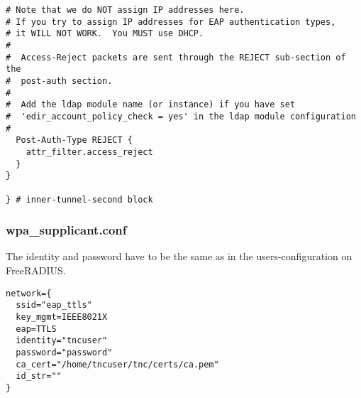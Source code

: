 \begin{lstlisting}[style=eapttls-config]
# Note that we do NOT assign IP addresses here.
# If you try to assign IP addresses for EAP authentication types,
# it WILL NOT WORK.  You MUST use DHCP.
#
#  Access-Reject packets are sent through the REJECT sub-section of the
#  post-auth section.
#
#  Add the ldap module name (or instance) if you have set 
#  'edir_account_policy_check = yes' in the ldap module configuration
#
  Post-Auth-Type REJECT {
    attr_filter.access_reject 
  }
}

} # inner-tunnel-second block
\end{lstlisting}

\subsubsection*{wpa\_supplicant.conf}
The identity and password have to be the same as in the users-configuration on FreeRADIUS.
\begin{lstlisting}[style=eapttls-config]
network={
  ssid="eap_ttls"
  key_mgmt=IEEE8021X
  eap=TTLS
  identity="tncuser"
  password="password"
  ca_cert="/home/tncuser/tnc/certs/ca.pem"
  id_str=""
}
\end{lstlisting}

